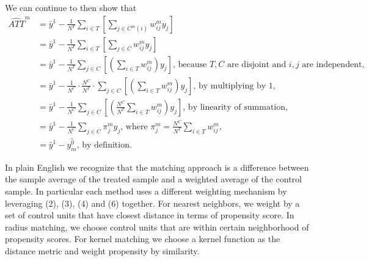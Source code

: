 \documentclass[
]{article}
\begin{document}
We can continue to then show that \begin{align*}
    \hat{ATT}^m &= \bar{y}^1 - \frac{1}{N^T} \sum_{i\in T}\left[\sum_{j\in C^m(i)} w_{ij}^m y_j\right] \\ 
    &= \bar{y}^1 - \frac{1}{N^T} \sum_{i\in T}\left[\sum_{j\in C} w_{ij}^m y_j\right]\\ 
    &= \bar{y}^1 - \frac{1}{N^T} \sum_{j\in C} \left[ \left(\sum_{i\in T} w_{ij}^m \right) y_j \right] \text{, because $T,C$ are disjoint and $i,j$ are independent,  }\\ 
    &= \bar{y}^1 - \frac{1}{N^C} \cdot \frac{N^C}{N^T} \cdot \sum_{j\in C} \left[ \left(\sum_{i\in T} w_{ij}^m\right) y_j \right] \text{, by multiplying by 1, }\\
    &= \bar{y}^1 - \frac{1}{N^C} \sum_{j\in C} \left[ \left(\frac{N^C}{N^T} \sum_{i\in T} w_{ij}^m \right) y_j \right]\text{, by linearity of summation, }\\ 
    &= \bar{y}^1 - \frac{1}{N^C} \sum_{j\in C} \pi_{j}^m y_j \text{, where } \pi_j^m = \frac{N^C}{N^T} \sum_{i\in T} w_{ij}^m \text{,}\\
    &= \bar{y}^1 - \bar{y_m^0} \text{, by definition.}  
\end{align*}

In plain English we recognize that the matching approach is a difference
between the sample average of the treated sample and a weighted average
of the control sample. In particular each method uses a different
weighting mechanism by leveraging (2), (3), (4) and (6) together. For
nearest neighbors, we weight by a set of control units that have closest
distance in terms of propensity score. In radius matching, we choose
control units that are within certain neighborhood of propensity scores.
For kernel matching we choose a kernel function as the distance metric
and weight propensity by similarity.
\end{document}

